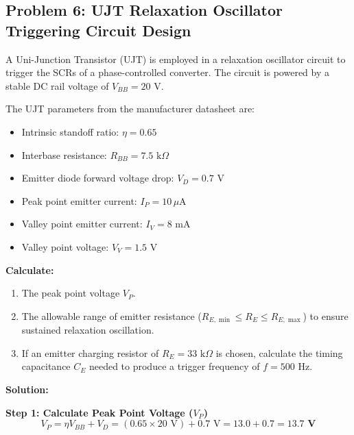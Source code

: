 \documentclass[11pt,a4paper]{article}
\begin{document}
\subsection{Problem 6: UJT Relaxation Oscillator Triggering Circuit Design}

\begin{examplebox}
A Uni-Junction Transistor (UJT) is employed in a relaxation oscillator circuit to trigger the SCRs of a phase-controlled converter. The circuit is powered by a stable DC rail voltage of $V_{BB} = 20\text{ V}$.

The UJT parameters from the manufacturer datasheet are:
\begin{itemize}[leftmargin=*]
  \item Intrinsic standoff ratio: $\eta = 0.65$
  \item Interbase resistance: $R_{BB} = 7.5\text{ k}\Omega$
  \item Emitter diode forward voltage drop: $V_D = 0.7\text{ V}$
  \item Peak point emitter current: $I_P = 10\,\mu\text{A}$
  \item Valley point emitter current: $I_V = 8\text{ mA}$
  \item Valley point voltage: $V_V = 1.5\text{ V}$
\end{itemize}

\textbf{Calculate:}
\begin{enumerate}[label=(\alph*)]
  \item The peak point voltage $V_P$.
  \item The allowable range of emitter resistance ($R_{E,\min} \le R_E \le R_{E,\max}$) to ensure sustained relaxation oscillation.
  \item If an emitter charging resistor of $R_E = 33\text{ k}\Omega$ is chosen, calculate the timing capacitance $C_E$ needed to produce a trigger frequency of $f = 500\text{ Hz}$.
\end{enumerate}

\tcblower
\textbf{Solution:}

\textbf{Step 1: Calculate Peak Point Voltage ($V_P$)}
\begin{equation}
V_P = \eta V_{BB} + V_D = (0.65 \times 20\text{ V}) + 0.7\text{ V} = 13.0 + 0.7 = \mathbf{13.7\text{ V}}
\end{equation}


\end{examplebox}
\end{document}
